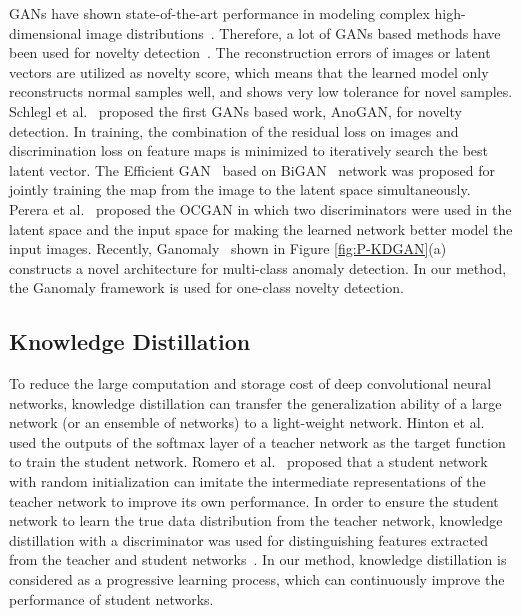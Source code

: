 \documentclass{article}
\begin{document}
	GANs have shown state-of-the-art performance in modeling complex high-dimensional image distributions~\cite{GAN:2014}. Therefore, a lot of GANs based methods have been used for novelty detection~\cite{AnoGAN:2017,EfficientGAN:2018,OCGAN:2019}. The reconstruction errors of images or latent vectors are utilized as novelty score, which means that the learned model only reconstructs normal samples well, and shows very low tolerance for novel samples. Schlegl et al.~\cite{AnoGAN:2017} proposed the first GANs based work, AnoGAN, for novelty detection. In training, the combination of the residual loss on images and discrimination loss on feature maps is minimized to iteratively search the best latent vector. The Efficient GAN~\cite{EfficientGAN:2018} based on BiGAN~\cite{BiGAN:2016} network was proposed for jointly training the map from the image to the latent space simultaneously. Perera et al.~\cite{OCGAN:2019} proposed the OCGAN in which two discriminators were used in the latent space and the input space for making the learned network better model the input images. Recently, Ganomaly~\cite{ganomaly:2018} shown in Figure \ref{fig:P-KDGAN}(a) constructs a novel architecture for multi-class anomaly detection. In our method, the Ganomaly framework is used for one-class novelty detection. 
	
	
	
	\subsection{Knowledge Distillation}
	To reduce the large computation and storage cost of deep convolutional neural networks, knowledge distillation can transfer the generalization ability of a large network (or an ensemble of networks) to a light-weight network. Hinton et al. ~\cite{Hinton:2015} used the outputs of the softmax layer of a teacher network as the target function to train the student network. Romero et al.~\cite{Fitnets:2015} proposed that a student network with random initialization can imitate the intermediate representations of the teacher network to improve its own performance. In order to ensure the student network to learn the true data distribution from the teacher network, knowledge distillation with a discriminator was used for distinguishing features extracted from the teacher and student networks~\cite{KDGAN:2018,Portable:2018,KTAN:2018}. In our method, knowledge distillation is considered as a progressive learning process, which can continuously improve the performance of student networks.
	
\end{document}
